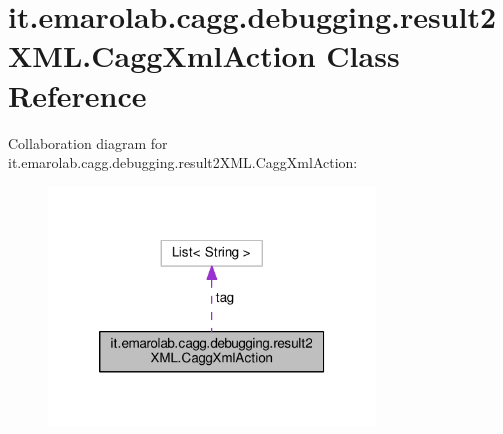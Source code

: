 \hypertarget{classit_1_1emarolab_1_1cagg_1_1debugging_1_1result2XML_1_1CaggXmlAction}{\section{it.\-emarolab.\-cagg.\-debugging.\-result2\-X\-M\-L.\-Cagg\-Xml\-Action Class Reference}
\label{classit_1_1emarolab_1_1cagg_1_1debugging_1_1result2XML_1_1CaggXmlAction}
}


Collaboration diagram for it.\-emarolab.\-cagg.\-debugging.\-result2\-X\-M\-L.\-Cagg\-Xml\-Action\-:\nopagebreak
\begin{figure}[H]
\begin{center}
\leavevmode
\includegraphics[width=246pt]{classit_1_1emarolab_1_1cagg_1_1debugging_1_1result2XML_1_1CaggXmlAction__coll__graph}
\end{center}
\end{figure}
